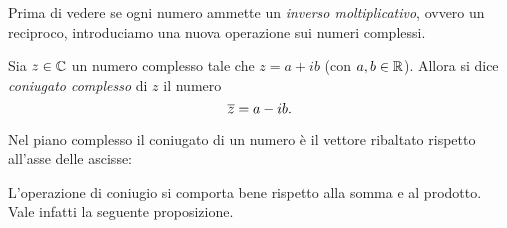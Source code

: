 Prima di vedere se ogni numero ammette un \emph{inverso moltiplicativo}, ovvero un reciproco, introduciamo una nuova operazione sui numeri complessi.

\begin{definition}
    Sia $z \in \mathbb{C}$ un numero complesso tale che $z = a+ib$ (con $a, b \in \mathbb{R}$). Allora si dice \emph{coniugato complesso} di $z$ il numero \begin{equation}
        \overline{z} = a - ib.
    \end{equation}
\end{definition}

Nel piano complesso il coniugato di un numero è il vettore ribaltato rispetto all'asse delle ascisse: \begin{center}
\end{center}

L'operazione di coniugio si comporta bene rispetto alla somma e al prodotto. Vale infatti la seguente proposizione.

